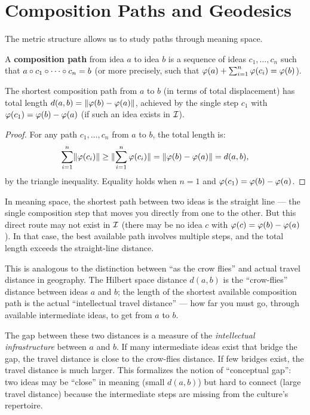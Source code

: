 \section{Composition Paths and Geodesics}

The metric structure allows us to study paths through meaning space.

\begin{definition}
\label{def:composition-path}
A \textbf{composition path} from idea $a$ to idea $b$ is a sequence of ideas
$c_1, \ldots, c_n$ such that $a \circ c_1 \circ \cdots \circ c_n = b$
(or more precisely, such that $\varphi(a) + \sum_{i=1}^n \varphi(c_i) =
\varphi(b)$).
\end{definition}

\begin{proposition}
\label{prop:optimal-path}
The shortest composition path from $a$ to $b$ (in terms of total displacement)
has total length $d(a, b) = \lVert \varphi(b) - \varphi(a) \rVert$, achieved by the
single step $c_1$ with $\varphi(c_1) = \varphi(b) - \varphi(a)$ (if such an idea
exists in $\mathcal{I}$).
\end{proposition}

\begin{proof}
For any path $c_1, \ldots, c_n$ from $a$ to $b$, the total length is:
\[
  \sum_{i=1}^n \lVert \varphi(c_i) \rVert \geq \lVert \sum_{i=1}^n \varphi(c_i) \rVert
  = \lVert \varphi(b) - \varphi(a) \rVert = d(a, b),
\]
by the triangle inequality. Equality holds when $n = 1$ and $\varphi(c_1) =
\varphi(b) - \varphi(a)$.
\end{proof}

\begin{interpretation}
\label{interp:geodesic}
In meaning space, the shortest path between two ideas is the straight line ---
the single composition step that moves you directly from one to the other. But
this direct route may not exist in $\mathcal{I}$ (there may be no idea $c$ with
$\varphi(c) = \varphi(b) - \varphi(a)$). In that case, the best available path
involves multiple steps, and the total length exceeds the straight-line
distance.

This is analogous to the distinction between ``as the crow flies'' and actual
travel distance in geography. The Hilbert space distance $d(a, b)$ is the
``crow-flies'' distance between ideas $a$ and $b$; the length of the shortest
available composition path is the actual ``intellectual travel distance'' ---
how far you must go, through available intermediate ideas, to get from $a$ to
$b$.

The gap between these two distances is a measure of the \emph{intellectual
infrastructure} between $a$ and $b$. If many intermediate ideas exist that
bridge the gap, the travel distance is close to the crow-flies distance. If
few bridges exist, the travel distance is much larger. This formalizes the
notion of ``conceptual gap'': two ideas may be ``close'' in meaning (small
$d(a, b)$) but hard to connect (large travel distance) because the intermediate
steps are missing from the culture's repertoire.
\end{interpretation}


